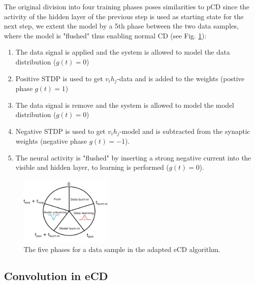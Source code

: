 The original division into four training phases poses similarities to pCD since the activity of the hidden layer of the previous step is used as starting state for the next step, we extent the model by a 5th phase between the two data samples, where the model is "flushed" thus enabling normal CD  (see Fig. \ref{fig:ecd5}):

\begin{enumerate}
\item The data signal is applied and the system is allowed to model the data distribution ($g(t)=0$)
\item Positive STDP is used to get $v_i h_j$-data and is added to the weights (postive phase $g(t)=1$)
\item The data signal is remove and the system is allowed to model the model distribution ($g(t)=0$)
\item Negative STDP is used to get $v_i h_j$-model and is subtracted from the synaptic weights (negative phase $g(t)=-1$).
\item The neural activity is "flushed" by inserting a strong negative current into the visible and hidden layer, to learning is performed ($g(t)=0$).
\end{enumerate}

\begin{figure}
	\centering
    	\includegraphics[width=0.4\textwidth]{imgs/eCD_5phases.png} 
    \caption{The five phases for a data sample in the adapted eCD algorithm. }
	\label{fig:ecd5}
\end{figure}

 
\subsection{Convolution in eCD} \label{c:ecdconv}

